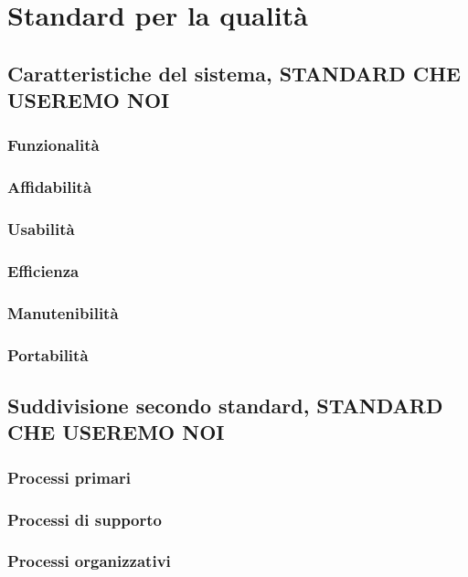 \section{Standard per la qualità}
\subsection{Caratteristiche del sistema, STANDARD CHE USEREMO NOI}
\subsubsection{Funzionalità}
\subsubsection{Affidabilità}
\subsubsection{Usabilità}
\subsubsection{Efficienza}
\subsubsection{Manutenibilità}
\subsubsection{Portabilità}
\subsection{Suddivisione secondo standard, STANDARD CHE USEREMO NOI}
\subsubsection{Processi primari}
\subsubsection{Processi di supporto}
\subsubsection{Processi organizzativi}
